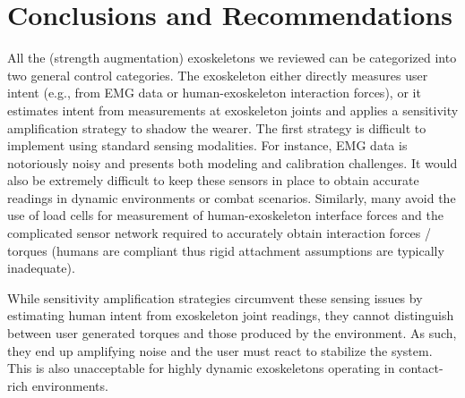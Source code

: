 \documentclass[letterpaper,12pt,fullpage]{article}
\begin{document}
%

















\section{Conclusions and Recommendations}
\label{survey:recommend}

All the (strength augmentation) exoskeletons we reviewed can be categorized into two general control categories.  The exoskeleton either directly measures user intent (e.g., from EMG data or human-exoskeleton interaction forces), or it estimates intent from measurements at exoskeleton joints and applies a sensitivity amplification strategy to shadow the wearer.  The first strategy is difficult to implement using standard sensing modalities.  For instance, EMG data is notoriously noisy and presents both modeling and calibration challenges.  It would also be extremely difficult to keep these sensors in place to obtain accurate readings in dynamic environments or combat scenarios.  Similarly, many avoid the use of load cells for measurement of human-exoskeleton interface forces and the complicated sensor network required to accurately obtain interaction forces / torques (humans are compliant thus rigid attachment assumptions are typically inadequate).

While sensitivity amplification strategies circumvent these sensing issues by estimating human intent from exoskeleton joint readings, they cannot distinguish between user generated torques and those produced by the environment.  As such, they end up amplifying noise and the user must react to stabilize the system.  This is also unacceptable for highly dynamic exoskeletons operating in contact-rich environments.
\end{document}
